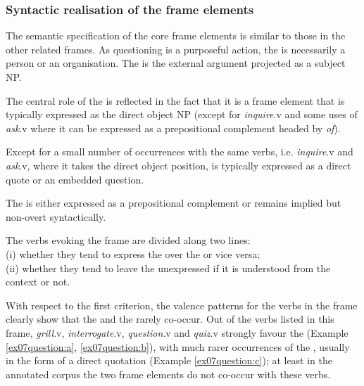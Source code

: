 \documentclass[output=paper,colorlinks,citecolor=brown]{langscibook}
\begin{document}
\subsubsection{Syntactic realisation of the  frame elements}

The semantic specification of the core frame elements is similar to those in the other related frames. As questioning is a purposeful action, the  is necessarily a person or an organisation. The  is the external argument projected as a subject NP. 

The central role of the  is reflected in the fact that it is a frame element that is typically expressed as the direct object NP (except for \textit{inquire}.v and some uses of \textit{ask}.v where it can be expressed as a prepositional complement headed by \textit{of}).

Except for a small number of occurrences with the same verbs, i.e. \textit{inquire}.v and \textit{ask}.v, where it takes the direct object position,  is typically expressed as a direct quote or an embedded question. 

The  is either expressed as a prepositional complement or remains implied but non-overt syntactically. 

The verbs evoking the frame  are divided along two lines:\\ (i) whether they tend to express the  over the  or vice versa; \\
(ii) whether they tend to leave the  unexpressed if it is understood from the context or not.
\largerpage
\begin{sloppypar}
With respect to the first criterion, the valence patterns for the verbs in the frame clearly show that the  and the  rarely co-occur. %
Out of the verbs listed in this frame, \textit{grill}.v, \textit{interrogate}.v, \textit{question}.v and \textit{quiz}.v strongly favour the  (Example \ref{ex07question:a}, \ref{ex07question:b}), with much rarer occurrences of the , usually in the form of a direct quotation (Example \ref{ex07question:c}); at least in the annotated corpus the two frame elements do not co-occur with these verbs. %
\end{sloppypar}
 
\end{document}
